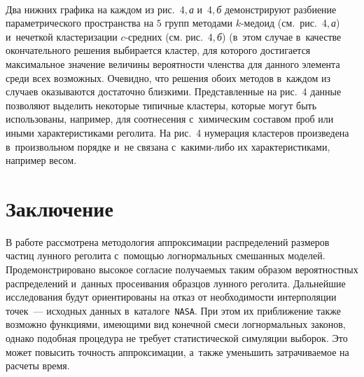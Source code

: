 \begin{multicols}{2}



\begin{figure*} %
\vspace*{1pt}
 \begin{center}
 \mbox{%
 \epsfxsize=154.153mm 
 }
 \end{center}
\vspace*{-9pt}
\label{FigClustersHermite}
\end{figure*}

Два нижних графика на каждом из рис.~4,\,\textit{а}
и~4,\,\textit{б} демонстрируют разбиение параметрического 
пространства на $5$ групп методами $k$-медоид 
(см.\ рис.~4,\,\textit{а}) и~нечеткой кластеризации 
$c$-сред\-них (см. рис.~4,\,\textit{б}) 
(в~этом случае в~качестве окончательного решения выбирается 
кластер, для которого достигается максимальное значение величины 
вероятности членства 
для данного элемента среди всех возможных. Очевидно, что решения обоих 
методов в~каждом из случаев оказываются достаточно близкими. 
Представленные на рис.~4 данные позволяют выделить некоторые 
типичные кластеры, которые могут быть использованы, например, для 
соотнесения с~химическим составом проб или иными характеристиками 
реголита. На рис.~4 нумерация клас\-те\-ров произведена в~произвольном порядке и~не
связана с~ка\-ки\-ми-ли\-бо их характеристиками, например весом.

\vspace*{-6pt}


\section{Заключение}

\vspace*{-2pt}

В работе рассмотрена методология аппрок\-си\-мации распределений размеров 
частиц лунного ре\-голита с~помощью логнормальных смешанных мо\-делей. 
Продемонстрировано высокое согласие получа\-емых таким образом 
вероятностных распределений и~данных просеивания образцов лунного 
реголита. Дальнейшие исследования будут ориентированы на отказ от 
необходимости интерполяции точек~--- исходных данных 
в~каталоге~\verb"NASA". При этом их приближение также возможно функциями, 
имеющими вид конечной смеси логнормальных законов, однако подобная 
процедура не требует статистической симуляции выборок. Это может повысить 
точность аппроксимации, а~также уменьшить затрачиваемое на расчеты время.



\end{multicols}
